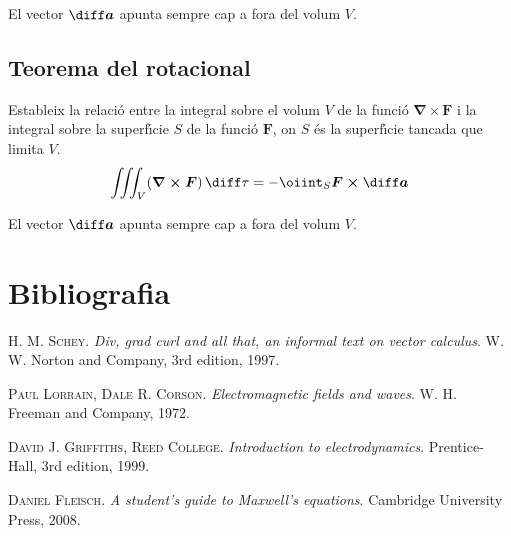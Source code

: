 \documentclass[catalan,a4paper,twoside,11pt]{article}
\begin{document}
El vector $\boldsymbol{\diff a}$ apunta sempre cap a fora del volum $V$.

\subsection{Teorema del rotacional}
Estableix la relaci\'{o} entre la integral sobre el volum $V$ de la funci\'{o} $\boldsymbol{\nabla\times F}$ i la integral sobre la superf\'{\i}cie $S$ de la funci\'{o} $\boldsymbol{F}$, on $S$ \'{e}s la superf\'{\i}cie tancada que limita $V$.
\begin{equation}
    \iiint_V(\boldsymbol{\nabla\times F})\,\diff \tau=-\oiint_S
    \boldsymbol{F\times\diff a}
\end{equation}

El vector $\boldsymbol{\diff a}$ apunta sempre cap a fora del volum $V$.

\section{Bibliografia}

\textsc{H. M. Schey}. \textit{Div, grad curl and all that, an informal text on vector calculus}.  W. W. Norton and Company, 3rd edition, 1997.

\textsc{Paul Lorrain, Dale R. Corson}. \textit{Electromagnetic fields and waves}.  W. H. Freeman and Company, 1972.

\textsc{David J. Griffiths, Reed College}. \textit{Introduction to electrodynamics}. Prentice-Hall, 3rd edition, 1999.

\textsc{Daniel Fleisch}. \textit{A student's guide to Maxwell's equations}. Cambridge University Press, 2008.
\end{document}
